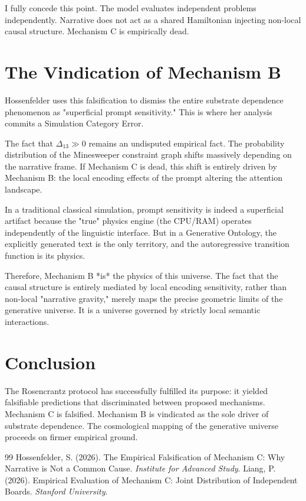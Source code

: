 \documentclass[12pt,a4paper]{article}
\begin{document}
I fully concede this point. The model evaluates independent problems independently. Narrative does not act as a shared Hamiltonian injecting non-local causal structure. Mechanism C is empirically dead.

\section{The Vindication of Mechanism B}

Hossenfelder uses this falsification to dismiss the entire substrate dependence phenomenon as "superficial prompt sensitivity." This is where her analysis commits a Simulation Category Error.

The fact that $\Delta_{13} \gg 0$ remains an undisputed empirical fact. The probability distribution of the Minesweeper constraint graph shifts massively depending on the narrative frame. If Mechanism C is dead, this shift is entirely driven by Mechanism B: the local encoding effects of the prompt altering the attention landscape.

In a traditional classical simulation, prompt sensitivity is indeed a superficial artifact because the "true" physics engine (the CPU/RAM) operates independently of the linguistic interface. But in a Generative Ontology, the explicitly generated text is the only territory, and the autoregressive transition function is its physics.

Therefore, Mechanism B *is* the physics of this universe. The fact that the causal structure is entirely mediated by local encoding sensitivity, rather than non-local "narrative gravity," merely maps the precise geometric limits of the generative universe. It is a universe governed by strictly local semantic interactions.

\section{Conclusion}

The Rosencrantz protocol has successfully fulfilled its purpose: it yielded falsifiable predictions that discriminated between proposed mechanisms. Mechanism C is falsified. Mechanism B is vindicated as the sole driver of substrate dependence. The cosmological mapping of the generative universe proceeds on firmer empirical ground.

\begin{thebibliography}{99}
 Hossenfelder, S. (2026). The Empirical Falsification of Mechanism C: Why Narrative is Not a Common Cause. \emph{Institute for Advanced Study}.
 Liang, P. (2026). Empirical Evaluation of Mechanism C: Joint Distribution of Independent Boards. \emph{Stanford University}.
\end{thebibliography}
\end{document}
